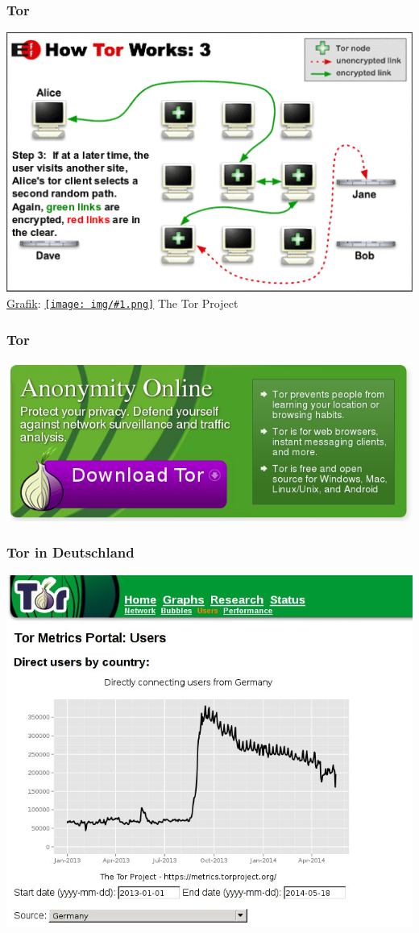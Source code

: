 \documentclass[12pt]{beamer}
\newcommand{\cc}[1]{\texttt{[image: img/\#1.png]}\hspace{1mm}}
\begin{document}
\begin{frame}
    \frametitle{Tor}
    \includegraphics[height=0.7\textheight]{img/tor3.png}
    \\{\small \href{https://www.torproject.org/images/htw3.png}{Grafik}: \href{https://creativecommons.org/licenses/by/3.0/us/}{\cc{by}} The Tor Project}
\end{frame}

\begin{frame}
  \frametitle{Tor}
  \includegraphics[height=0.5\textheight]{img/tor-banner.png}
\end{frame}

\begin{frame}
    \frametitle{Tor in Deutschland}
    \includegraphics[height=0.7\textheight]{img/torgermany.jpg}
\end{frame}
\end{document}
